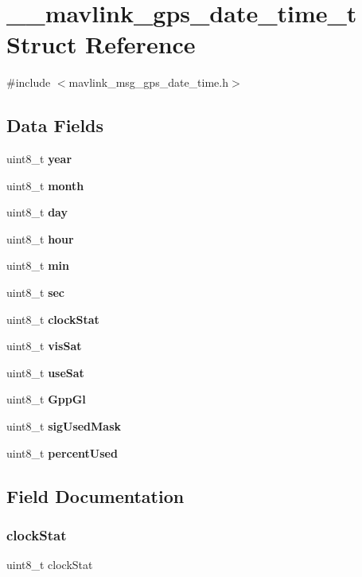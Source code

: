 \section{\+\_\+\+\_\+mavlink\+\_\+gps\+\_\+date\+\_\+time\+\_\+t Struct Reference}
\label{struct____mavlink__gps__date__time__t}


{\ttfamily \#include $<$mavlink\+\_\+msg\+\_\+gps\+\_\+date\+\_\+time.\+h$>$}

\subsection*{Data Fields}
\begin{DoxyCompactItemize}
\item 
uint8\+\_\+t \textbf{ year}
\item 
uint8\+\_\+t \textbf{ month}
\item 
uint8\+\_\+t \textbf{ day}
\item 
uint8\+\_\+t \textbf{ hour}
\item 
uint8\+\_\+t \textbf{ min}
\item 
uint8\+\_\+t \textbf{ sec}
\item 
uint8\+\_\+t \textbf{ clock\+Stat}
\item 
uint8\+\_\+t \textbf{ vis\+Sat}
\item 
uint8\+\_\+t \textbf{ use\+Sat}
\item 
uint8\+\_\+t \textbf{ Gpp\+Gl}
\item 
uint8\+\_\+t \textbf{ sig\+Used\+Mask}
\item 
uint8\+\_\+t \textbf{ percent\+Used}
\end{DoxyCompactItemize}


\subsection{Field Documentation}
\mbox{\label{struct____mavlink__gps__date__time__t_a278003c741f7d88b65961a00f3c9c2aa}} 
\subsubsection{clock\+Stat}
{\footnotesize\ttfamily uint8\+\_\+t clock\+Stat}

